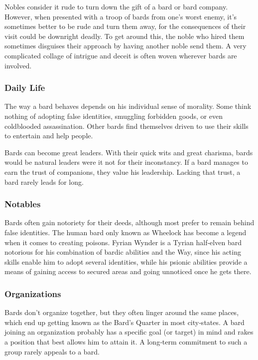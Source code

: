 \documentclass[10pt,a4paper,twocolumn]{d20}
\begin{document}
{Nobles consider it rude to turn down the gift of a bard or bard company. However, when presented with a troop of bards from one’s worst enemy, it’s sometimes better to be rude and turn them away, for the consequences of their visit could be downright deadly. To get around this, the noble who hired them sometimes disguises their approach by having another noble send them. A very complicated collage of intrigue and deceit is often woven wherever bards are involved.

\subsubsection{Daily Life}

The way a bard behaves depends on his individual sense of morality. Some think nothing of adopting false identities, smuggling forbidden goods, or even coldblooded assassination. Other bards find themselves driven to use their skills to entertain and help people.

Bards can become great leaders. With their quick wits and great charisma, bards would be natural leaders were it not for their inconstancy. If a bard manages to earn the trust of companions, they value his leadership. Lacking that trust, a bard rarely leads for long.

\subsubsection{Notables}

Bards often gain notoriety for their deeds, although most prefer to remain behind false identities. The human bard only known as Wheelock has become a legend when it comes to creating poisons. Fyrian Wynder is a Tyrian half‐elven bard notorious for his combination of bardic abilities and the Way, since his acting skills enable him to adopt several identities, while his psionic abilities provide a means of gaining access to secured areas and going unnoticed once he gets there.

\subsubsection{Organizations}

Bards don’t organize together, but they often linger around the same places, which end up getting known as the Bard’s Quarter in most city‐states. A bard joining an organization probably has a specific goal (or target) in mind and rakes a position that best allows him to attain it. A long‐term commitment to such a group rarely appeals to a bard.

}
\end{document}

